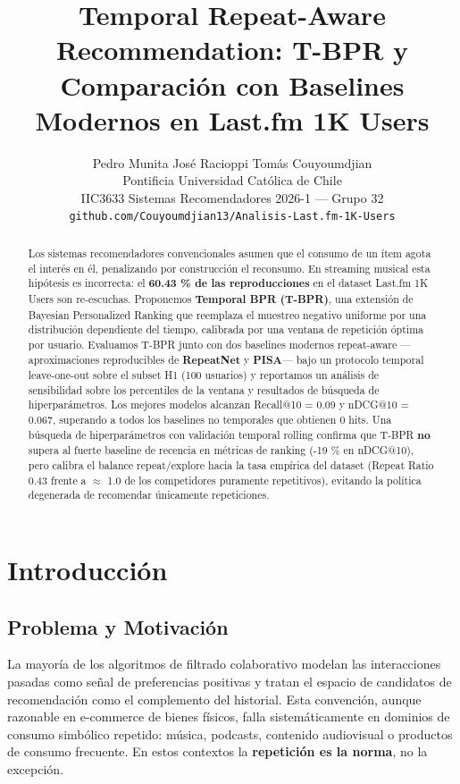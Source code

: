 \documentclass{article}
\title{Temporal Repeat-Aware Recommendation: T-BPR y Comparaci\'on con
Baselines Modernos en Last.fm 1K Users}
\author{%
  Pedro Munita \quad Jos\'e Racioppi \quad Tom\'as Couyoumdjian \\
  Pontificia Universidad Cat\'olica de Chile \\
  IIC3633 Sistemas Recomendadores 2026-1 --- Grupo 32 \\
  \texttt{github.com/Couyoumdjian13/Analisis-Last.fm-1K-Users}%
}
\begin{document}
\maketitle

\begin{abstract}
Los sistemas recomendadores convencionales asumen que el consumo de un ítem agota el interés en él, penalizando por construcción el reconsumo. En streaming musical esta hipótesis es incorrecta: el \textbf{60.43 \% de las reproducciones} en el dataset Last.fm 1K Users son re-escuchas. Proponemos \textbf{Temporal BPR (T-BPR)}, una extensión de Bayesian Personalized Ranking que reemplaza el muestreo negativo uniforme por una distribución dependiente del tiempo, calibrada por una ventana de repetición óptima por usuario. Evaluamos T-BPR junto con dos baselines modernos repeat-aware ---aproximaciones reproducibles de \textbf{RepeatNet} y \textbf{PISA}--- bajo un protocolo temporal leave-one-out sobre el subset H1 (100 usuarios) y reportamos un análisis de sensibilidad sobre los percentiles de la ventana y resultados de búsqueda de hiperparámetros. Los mejores modelos alcanzan Recall@10 = 0.09 y nDCG@10 = 0.067, superando a todos los baselines no temporales que obtienen 0 hits. Una búsqueda de hiperparámetros con validación temporal rolling confirma que T-BPR \textbf{no} supera al fuerte baseline de recencia en métricas de ranking (-19 \% en nDCG@10), pero calibra el balance repeat/explore hacia la tasa empírica del dataset (Repeat Ratio 0.43 frente a $\approx$ 1.0 de los competidores puramente repetitivos), evitando la política degenerada de recomendar únicamente repeticiones.
\end{abstract}

\section{Introducción}\label{introducciuxf3n}

\subsection{Problema y Motivación}\label{problema-y-motivaciuxf3n}

La mayoría de los algoritmos de filtrado colaborativo modelan las interacciones pasadas como señal de preferencias positivas y tratan el espacio de candidatos de recomendación como el complemento del historial. Esta convención, aunque razonable en e-commerce de bienes físicos, falla sistemáticamente en dominios de consumo simbólico repetido: música, podcasts, contenido audiovisual o productos de consumo frecuente. En estos contextos la \textbf{repetición es la norma}, no la excepción.
\end{document}
